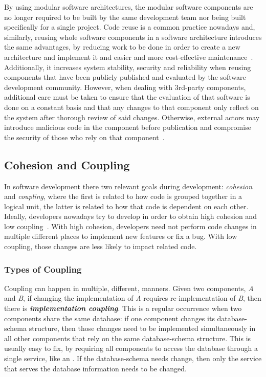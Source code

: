 By using modular software architectures, the modular software components are no longer required to be built by the same development team nor being built specifically for a single project. 
Code reuse is a common practice nowadays and, similarly, reusing whole software components in a software architecture introduces the same advantages, by reducing work to be done in order to create a new architecture and implement it and easier and more cost-effective maintenance~\Parencite{hasselbring2018software}. Additionally, it increases system stability, security and reliability when reusing components that have been publicly published and evaluated by the software development community. However, when dealing with 3rd-party components, additional care must be taken to ensure that the evaluation of that software is done on a constant basis and that any changes to that component only reflect on the system after thorough review of said changes. Otherwise, external actors may introduce malicious code in the component before publication and compromise the security of those who rely on that component~\Parencite{tal_2022}.

\subsection{Cohesion and Coupling}\label{state-of-the-art:ss:cohesion-and-coupling}
In software development there two relevant goals during development: \textit{cohesion} and \textit{coupling}, where the first is related to how code is grouped together in a logical unit, the latter is related to how that code is dependent on each other. Ideally, developers nowadays try to develop in order to obtain high cohesion and low coupling~\Parencite{candela_bavota_russo_oliveto_2016}. With high cohesion, developers need not perform code changes in multiple different places to implement new features or fix a bug. With low coupling, those changes are less likely to impact related code.

\subsubsection*{Types of Coupling}\label{state-of-the-art:ss:types-of-coupling}


Coupling can happen in multiple, different, manners. Given two components, \textit{A} and \textit{B}, if changing the implementation of \textit{A} requires re-implementation of \textit{B}, then there is \textbf{\textit{implementation coupling}}. This is a regular occurrence when two components share the same database: if one component changes its database-schema structure, then those changes need to be implemented simultaneously in all other components that rely on the same database-schema structure. This is usually easy to fix, by requiring all components to access the database through a single service, like an . If the database-schema needs change, then only the service that serves the database information needs to be changed.

